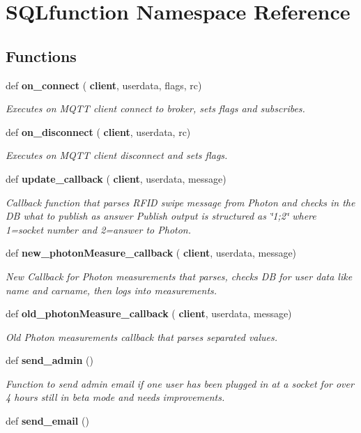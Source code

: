 \section{S\+Q\+Lfunction Namespace Reference}
\label{namespace_s_q_lfunction}
\subsection*{Functions}
\begin{DoxyCompactItemize}
\item 
def \textbf{ on\+\_\+connect} (\textbf{ client}, userdata, flags, rc)
\begin{DoxyCompactList}\small\item\em Executes on M\+Q\+TT client connect to broker, sets flags and subscribes. \end{DoxyCompactList}\item 
def \textbf{ on\+\_\+disconnect} (\textbf{ client}, userdata, rc)
\begin{DoxyCompactList}\small\item\em Executes on M\+Q\+TT client disconnect and sets flags. \end{DoxyCompactList}\item 
def \textbf{ update\+\_\+callback} (\textbf{ client}, userdata, message)
\begin{DoxyCompactList}\small\item\em Callback function that parses R\+F\+ID swipe message from Photon and checks in the DB what to publish as answer Publish output is structured as \char`\"{}1;2\char`\"{} where 1=socket number and 2=answer to Photon. \end{DoxyCompactList}\item 
def \textbf{ new\+\_\+photon\+Measure\+\_\+callback} (\textbf{ client}, userdata, message)
\begin{DoxyCompactList}\small\item\em New Callback for Photon measurements that parses, checks DB for user data like name and carname, then logs into \textquotesingle{}measurements\textquotesingle{}. \end{DoxyCompactList}\item 
def \textbf{ old\+\_\+photon\+Measure\+\_\+callback} (\textbf{ client}, userdata, message)
\begin{DoxyCompactList}\small\item\em Old Photon measurements callback that parses \textquotesingle{}\textquotesingle{} separated values. \end{DoxyCompactList}\item 
def \textbf{ send\+\_\+admin} ()
\begin{DoxyCompactList}\small\item\em Function to send admin email if one user has been plugged in at a socket for over 4 hours still in beta mode and needs improvements. \end{DoxyCompactList}\item 
def \textbf{ send\+\_\+email} ()
\end{DoxyCompactItemize}
